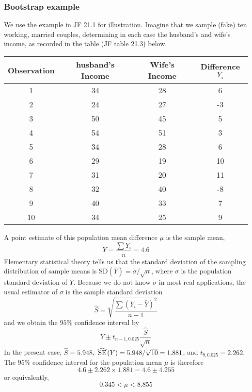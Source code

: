 \subsubsection*{Bootstrap example}
We use the example in JF 21.1 for illustration.
Imagine that we sample (fake) ten working, married couples, determining in each case the husband's and wife's income, as recorded in the table (JF table 21.3) below.
	\begin{table}[H]
	\renewcommand{\arraystretch}{1.5}
	\centering
	\begin{tabular}{cccc}
		\toprule
		Observation & husband's Income& Wife's Income & Difference $Y_i$\\
		\hline
		1 & 34 & 28 & 6\\
		2 & 24 & 27 & -3\\
		3 & 50 & 45 & 5\\
		4 & 54 & 51 & 3\\
		5 & 34 & 28 & 6\\
		6 & 29 & 19 & 10\\
		7 & 31 & 20 & 11\\
		8 & 32 & 40 & -8\\
		9 & 40 & 33 & 7\\
		10 & 34 & 25 & 9\\
		\bottomrule
	\end{tabular}
\end{table}

A point estimate of this population mean difference $\mu$ is the sample mean,
$$
\bar{Y} = \frac{\sum Y_i}{n} = 4.6
$$
Elementary statistical theory tells us that the standard deviation of the sampling distribution of sample means is $\mbox{SD}(\bar{Y}) = \sigma/\sqrt{n}$, where $\sigma$ is the population standard deviation of $Y$.  Because we do not know $\sigma$ in most real applications, the usual estimator of $\sigma$ is the sample standard deviation
$$
\hat{S}=\sqrt{\frac{\sum(Y_i - \bar{Y})^2}{n - 1}}
$$
and we obtain the $95\%$ confidence interval by
$$
\bar{Y} \pm t_{n - 1, 0.025} \frac{\hat{S}}{\sqrt{n}}
$$
In the present case, $\hat{S} = 5.948$, $\reallywidehat{SE}(\bar{Y}) = 5.948/\sqrt{10} = 1.881$, and $t_{9, 0.025} = 2.262$.
The $95\%$ confidence interval for the population mean $\mu$ is therefore
$$
4.6 \pm 2.262 \times 1.881 = 4.6 \pm 4.255
$$
or equivalently,
$$
0.345 < \mu < 8.855
$$

